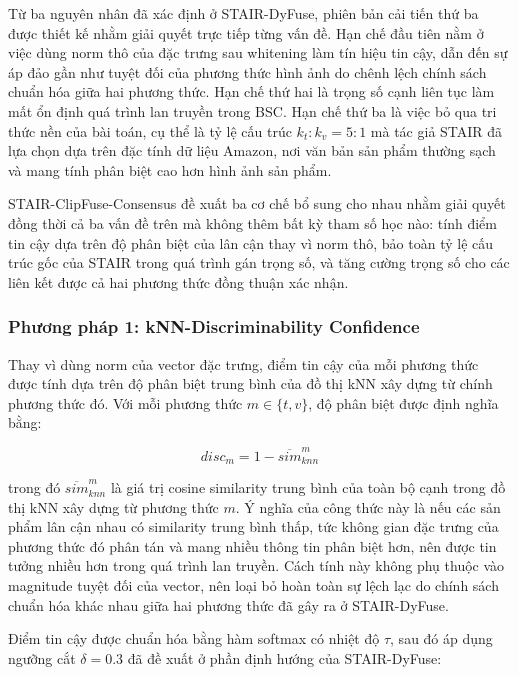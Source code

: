 \begin{longtable}
 
Từ ba nguyên nhân đã xác định ở STAIR-DyFuse, phiên bản cải tiến thứ ba được thiết kế nhằm giải quyết trực tiếp từng vấn đề. Hạn chế đầu tiên nằm ở việc dùng norm thô của đặc trưng sau whitening làm tín hiệu tin cậy, dẫn đến sự áp đảo gần như tuyệt đối của phương thức hình ảnh do chênh lệch chính sách chuẩn hóa giữa hai phương thức. Hạn chế thứ hai là trọng số cạnh liên tục làm mất ổn định quá trình lan truyền trong BSC. Hạn chế thứ ba là việc bỏ qua tri thức nền của bài toán, cụ thể là tỷ lệ cấu trúc $k_t{:}k_v = 5{:}1$ mà tác giả STAIR đã lựa chọn dựa trên đặc tính dữ liệu Amazon, nơi văn bản sản phẩm thường sạch và mang tính phân biệt cao hơn hình ảnh sản phẩm.
 
STAIR-ClipFuse-Consensus đề xuất ba cơ chế bổ sung cho nhau nhằm giải quyết đồng thời cả ba vấn đề trên mà không thêm bất kỳ tham số học nào: tính điểm tin cậy dựa trên độ phân biệt của lân cận thay vì norm thô, bảo toàn tỷ lệ cấu trúc gốc của STAIR trong quá trình gán trọng số, và tăng cường trọng số cho các liên kết được cả hai phương thức đồng thuận xác nhận.
 
\subsubsection{Phương pháp 1: kNN-Discriminability Confidence}
 
Thay vì dùng norm của vector đặc trưng, điểm tin cậy của mỗi phương thức được tính dựa trên độ phân biệt trung bình của đồ thị kNN xây dựng từ chính phương thức đó. Với mỗi phương thức $m \in \{t, v\}$, độ phân biệt được định nghĩa bằng:
 
\begin{equation}
disc_m = 1 - \overline{sim}_{knn}^{m}
\end{equation}
 
trong đó $\overline{sim}_{knn}^{m}$ là giá trị cosine similarity trung bình của toàn bộ cạnh trong đồ thị kNN xây dựng từ phương thức $m$. Ý nghĩa của công thức này là nếu các sản phẩm lân cận nhau có similarity trung bình thấp, tức không gian đặc trưng của phương thức đó phân tán và mang nhiều thông tin phân biệt hơn, nên được tin tưởng nhiều hơn trong quá trình lan truyền. Cách tính này không phụ thuộc vào magnitude tuyệt đối của vector, nên loại bỏ hoàn toàn sự lệch lạc do chính sách chuẩn hóa khác nhau giữa hai phương thức đã gây ra ở STAIR-DyFuse.
 
Điểm tin cậy được chuẩn hóa bằng hàm softmax có nhiệt độ $\tau$, sau đó áp dụng ngưỡng cắt $\delta = 0.3$ đã đề xuất ở phần định hướng của STAIR-DyFuse:
 

\end{longtable}
